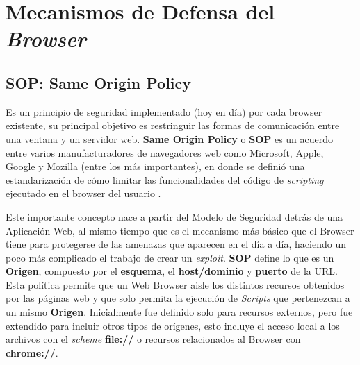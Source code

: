 




\section{Mecanismos de Defensa del \textit{Browser}}

\subsection{SOP: Same Origin Policy} %
\label{chap2:SOP}

    Es un principio de seguridad implementado (hoy en día) por cada browser existente, su principal objetivo es restringuir las formas de comunicación entre una ventana y un servidor web. \textbf{Same Origin Policy} o \textbf{SOP} es un acuerdo entre varios manufacturadores de navegadores web como Microsoft, Apple, Google y Mozilla (entre los más importantes), en donde se definió una estandarización de cómo limitar las funcionalidades del código de \textit{scripting} ejecutado en el browser del usuario \cite{SOPIEFT}. 

    Este importante concepto nace a partir del Modelo de Seguridad detrás de una Aplicación Web, al mismo tiempo que es el mecanismo más básico que el Browser tiene para protegerse de las amenazas que aparecen en el día a día, haciendo un poco más complicado el trabajo de crear un \textit{exploit}. \textbf{SOP} define lo que es un \textbf{Origen}, compuesto por el \textbf{esquema}, el \textbf{host/dominio} y \textbf{puerto} de la URL. Esta política permite que un Web Browser aisle los distintos recursos obtenidos por las páginas web y que solo permita la ejecución de \textit{Scripts} que pertenezcan a un mismo \textbf{Origen}. Inicialmente fue definido solo para recursos externos, pero fue extendido para incluir otros tipos de orígenes, esto incluye el acceso local a los archivos con el \textit{scheme} \textbf{file://} o recursos relacionados al Browser con \textbf{chrome://}.

